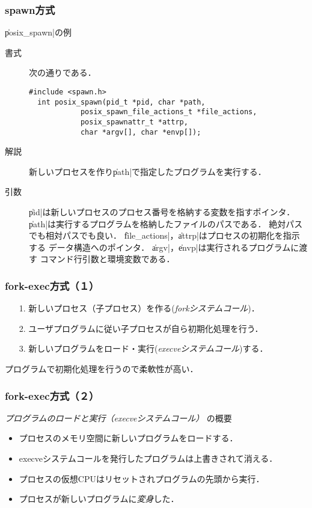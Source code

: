 \documentclass{beamer}                 %
\begin{document}
\begin{frame}[fragile]
  \frametitle{spawn方式}
  \|posix_spawn|の例 \\
  \begin{description}
  \item[書式] 次の通りである．
\begin{lstlisting}[numbers=none]
  #include <spawn.h>
  int posix_spawn(pid_t *pid, char *path,
            posix_spawn_file_actions_t *file_actions,
            posix_spawnattr_t *attrp,
            char *argv[], char *envp[]);
\end{lstlisting}

  \item[解説]
    新しいプロセスを作り\|path|で指定したプログラムを実行する．

  \item[引数]
    \|pid|は新しいプロセスのプロセス番号を格納する変数を指すポインタ．
    \|path|は実行するプログラムを格納したファイルのパスである．
    絶対パスでも相対パスでも良い．
    \|file_actions|，\|attrp|はプロセスの初期化を指示する
    データ構造へのポインタ．
    \|argv|，\|envp|は実行されるプログラムに渡す
    コマンド行引数と環境変数である．
  \end{description}
\end{frame}

\begin{frame}[fragile]
  \frametitle{fork-exec方式（１）}
  \begin{enumerate}
  \item[1.] 新しいプロセス（子プロセス）を作る(\emph{forkシステムコール})．
  \item[2.] ユーザプログラムに従い子プロセスが自ら初期化処理を行う．
  \item[3.] 新しいプログラムをロード・実行(\emph{execveシステムコール})する．
  \end{enumerate}
  プログラムで初期化処理を行うので柔軟性が高い．
  \vfill
\end{frame}

\begin{frame}[fragile]
  \frametitle{fork-exec方式（２）}
  \emph{プログラムのロードと実行（execveシステムコール）} の概要\\
  \begin{itemize}
  \item プロセスのメモリ空間に新しいプログラムをロードする．
  \item execveシステムコールを発行したプログラムは上書きされて消える．
  \item プロセスの仮想CPUはリセットされプログラムの先頭から実行．
  \item プロセスが新しいプログラムに\emph{変身}した．
  \end{itemize}
\end{frame}
\end{document}
